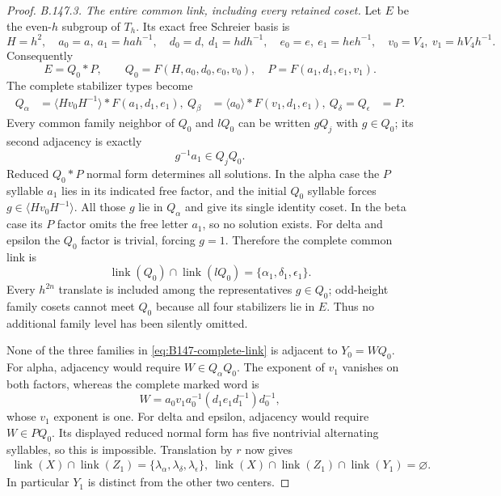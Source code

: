 \begin{proof}
\emph{B.147.3. The entire common link, including every retained coset.}
Let $E$ be the even-$h$ subgroup of $T_h$. Its exact free Schreier
basis is
\[
 H=h^2,\quad a_0=a,\ a_1=hah^{-1},\quad
 d_0=d,\ d_1=hdh^{-1},\quad e_0=e,\ e_1=heh^{-1},\quad
 v_0=V_4,\ v_1=hV_4h^{-1}.
\]
Consequently
\begin{equation}\label{eq:B147-free-factors}
 E=Q_0*P,\qquad
 Q_0=F(H,a_0,d_0,e_0,v_0),\quad P=F(a_1,d_1,e_1,v_1).
\end{equation}
The complete stabilizer types become
\begin{equation}\label{eq:B147-stabilizer-products}
\begin{aligned}
 Q_\alpha&=\langle Hv_0H^{-1}\rangle*F(a_1,d_1,e_1),\
 Q_\beta&=\langle a_0\rangle*F(v_1,d_1,e_1),\
 Q_\delta=Q_\epsilon&=P.
\end{aligned}
\end{equation}
Every common family neighbor of $Q_0$ and $lQ_0$ can be written
$gQ_j$ with $g\in Q_0$; its second adjacency is exactly
\begin{equation}\label{eq:B147-coset-condition}
 g^{-1}a_1\in Q_jQ_0.
\end{equation}
Reduced $Q_0*P$ normal form determines all solutions. In the
alpha case the $P$ syllable $a_1$ lies in its indicated free
factor, and the initial $Q_0$ syllable forces
$g\in\langle Hv_0H^{-1}\rangle$. All those $g$ lie in
$Q_\alpha$ and give its single identity coset. In the beta case
its $P$ factor omits the free letter $a_1$, so no solution exists.
For delta and epsilon the $Q_0$ factor is trivial, forcing $g=1$.
Therefore the complete common link is
\begin{equation}\label{eq:B147-complete-link}
 \operatorname{link}(Q_0)\cap\operatorname{link}(lQ_0)
                  =\{\alpha_1,\delta_1,\epsilon_1\}.
\end{equation}
Every $h^{2n}$ translate is included among the representatives
$g\in Q_0$; odd-height family cosets cannot meet $Q_0$ because
all four stabilizers lie in $E$. Thus no additional family level
has been silently omitted.

None of the three families in \eqref{eq:B147-complete-link} is
adjacent to $Y_0=WQ_0$. For alpha, adjacency would require
$W\in Q_\alpha Q_0$. The exponent of $v_1$ vanishes on both
factors, whereas the complete marked word is
\begin{equation}\label{eq:B147-W-normal}
 W=a_0v_1a_0^{-1}(d_1e_1d_1^{-1})d_0^{-1},
\end{equation}
whose $v_1$ exponent is one. For delta and epsilon, adjacency
would require $W\in PQ_0$. Its displayed reduced normal form
has five nontrivial alternating syllables, so this is impossible.
Translation by $r$ now gives
\begin{equation}\label{eq:B147-triple-link}
\begin{gathered}
 \operatorname{link}(X)\cap\operatorname{link}(Z_1)
       =\{\lambda_\alpha,\lambda_\delta,\lambda_\epsilon\},\
 \operatorname{link}(X)\cap\operatorname{link}(Z_1)
                    \cap\operatorname{link}(Y_1)=\varnothing.
\end{gathered}
\end{equation}
In particular $Y_1$ is distinct from the other two centers.


\end{proof}
